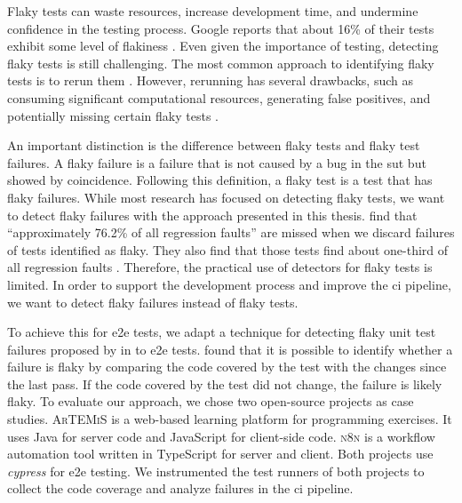 Flaky tests can waste resources, increase development time, and undermine confidence in the testing process.
Google reports that about 16\% of their tests exhibit some level of flakiness \autocite{micco_state_2017}.
Even given the importance of testing, detecting flaky tests is still challenging.
The most common approach to identifying flaky tests is to rerun them \autocite{lam_idflakies_2019, lam_understanding_2020}.
However, rerunning has several drawbacks, such as consuming significant computational resources, generating false positives, and potentially missing certain flaky tests \autocite{bell_deflaker_2018, luo_empirical_2014}.

An important distinction is the difference between flaky tests and flaky test failures.
A flaky failure is a failure that is not caused by a bug in the \ac{sut} but showed by coincidence.
Following this definition, a flaky test is a test that has flaky failures.
While most research has focused on detecting flaky tests, we want to detect flaky failures with the approach presented in this thesis.
 find that \enquote{approximately 76.2\% of all regression faults} \autocite{haben_importance_2023} are missed when we discard failures of tests identified as flaky.
They also find that those tests find about one-third of all regression faults \autocite{haben_importance_2023}.
Therefore, the practical use of detectors for flaky tests is limited.
In order to support the development process and improve the \ac{ci} pipeline, we want to detect flaky failures instead of flaky tests.

To achieve this for \ac{e2e} tests, we adapt a technique for detecting flaky unit test failures proposed by \citeauthor*{bell_deflaker_2018} in  \autocite{bell_deflaker_2018} to \ac{e2e} tests.
 found that it is possible to identify whether a failure is flaky by comparing the code covered by the test with the changes since the last pass.
If the code covered by the test did not change, the failure is likely flaky.
To evaluate our approach, we chose two open-source projects as case studies.
\textsc{ArTEMiS} \autocite{krusche_artemis_2018} is a web-based learning platform for programming exercises.
It uses Java for server code and JavaScript for client-side code.
\textsc{n8n} \autocite{noauthor_n8n_2023} is a workflow automation tool written in TypeScript for server and client.
Both projects use \textit{cypress} \autocite{noauthor_cypress-iocypress_2023} for \ac{e2e} testing.
We instrumented the test runners of both projects to collect the code coverage and analyze failures in the \ac{ci} pipeline.

